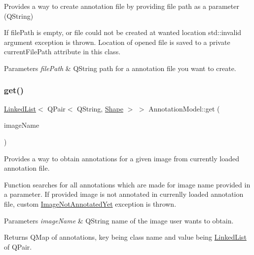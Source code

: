 Provides a way to create annotation file by providing file path as a parameter (Q\+String) 

If file\+Path is empty, or file could not be created at wanted location std\+::invalid argument exception is thrown. Location of opened file is saved to a private current\+File\+Path attribute in this class.


\begin{DoxyParams}{Parameters}
{\em file\+Path} & Q\+String path for a annotation file you want to create. \\
\hline
\end{DoxyParams}
\mbox{\label{classAnnotationModel_a94c840624e8ad25d8c7d5abf1c0e255b}} 
\subsubsection{\texorpdfstring{get()}{get()}}
{\footnotesize\ttfamily \hyperlink{classLinkedList}{Linked\+List}$<$ Q\+Pair$<$ Q\+String, \hyperlink{classLinkedList}{Shape} $>$ $>$ Annotation\+Model\+::get (\begin{DoxyParamCaption}\item[{const Q\+String \&}]{image\+Name }\end{DoxyParamCaption})}



Provides a way to obtain annotations for a given image from currently loaded annotation file. 

Function searches for all annotations which are made for image name provided in a parameter. If provided image is not annotated in currenlly loaded annotation file, custom \hyperlink{classImageNotAnnotatedYet}{Image\+Not\+Annotated\+Yet} exception is thrown.


\begin{DoxyParams}{Parameters}
{\em image\+Name} & Q\+String name of the image user wants to obtain. \\
\hline
\end{DoxyParams}
\begin{DoxyReturn}{Returns}
Q\+Map of annotations, key being class name and value being \hyperlink{classLinkedList}{Linked\+List} of Q\+Pair. 
\end{DoxyReturn}
\mbox{\label{classAnnotationModel_a704170b9d4cc9e6b62e0bc22d17f6e17}} 
